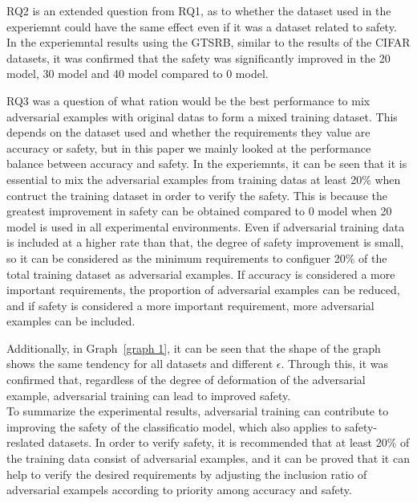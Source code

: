 \documentclass[journal,article,submit,moreauthors,pdftex]{Definitions/mdpi}
\begin{document}
RQ2 is an extended question from RQ1, as to whether the dataset used in the experiemnt could have the same effect even if it was a dataset related to safety.
In the experiemntal results using the GTSRB, similar to the results of the CIFAR datasets, it was confirmed that the safety was significantly improved in the 20 model, 30 model and 40 model compared to 0 model.

RQ3 was a question of what ration would be the best performance to mix adversarial examples with original datas to form a mixed training dataset.
This depends on the dataset used and whether the requirements they value are accuracy or safety, but in this paper we mainly looked at the performance balance between accuracy and safety.
In the experiemnts, it can be seen that it is essential to mix the adversarial examples from training datas at least 20\% when contruct the training dataset in order to verify the safety.
This is because the greatest improvement in safety can be obtained compared to 0 model when 20 model is used in all experimental environments.
Even if adversarial training data is included at a higher rate than that, the degree of safety improvement is small, so it can be considered as the minimum requirements to configuer 20\% of the total training dataset as adversarial examples.
If accuracy is considered a more important requirements, the proportion of adversarial examples can be reduced, and if safety is considered a more important requirement, more adversarial examples can be included.

Additionally, in Graph~\ref{graph 1}, it can be seen that the shape of the graph shows the same tendency for all datasets and different \begin{math}\epsilon\end{math}.
Through this, it was confirmed that, regardless of the degree of deformation of the adversarial example, adversarial training can lead to improved safety. \\

To summarize the experimental results, adversarial training can contribute to improving the safety of the classificatio model, which also applies to safety-reslated datasets.
In order to verify safety, it is recommended that at least 20\% of the training data consist of adversarial examples, and it can be proved that it can help to verify the desired requirements by adjusting the inclusion ratio of adversarial exampels according to priority among accuracy and safety.

\end{document}
